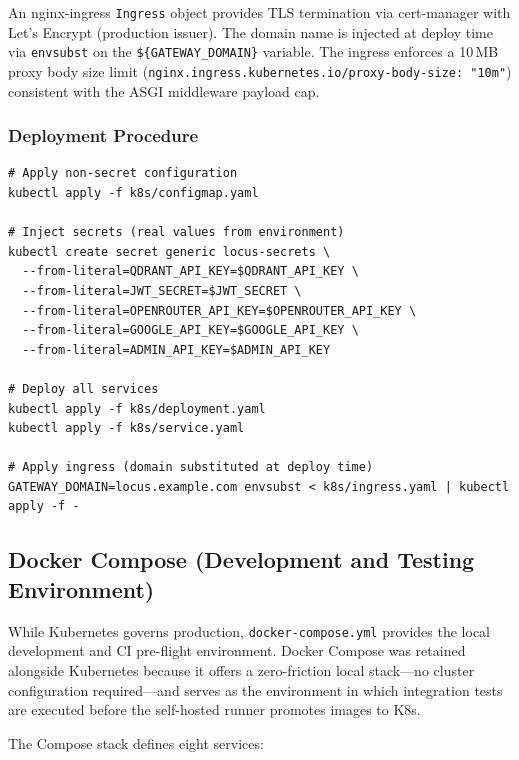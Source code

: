 \documentclass[12pt]{article}
\begin{document}
An nginx-ingress \texttt{Ingress} object provides TLS termination via cert-manager with Let's Encrypt (production issuer). The domain name is injected at deploy time via \texttt{envsubst} on the \texttt{\$\{GATEWAY\_DOMAIN\}} variable. The ingress enforces a 10\,MB proxy body size limit (\texttt{nginx.ingress.kubernetes.io/proxy-body-size: "10m"}) consistent with the ASGI middleware payload cap.

\subsubsection{Deployment Procedure}

\begin{lstlisting}[caption={Kubernetes deployment commands on Azure Standard\_B2ms}]
# Apply non-secret configuration
kubectl apply -f k8s/configmap.yaml

# Inject secrets (real values from environment)
kubectl create secret generic locus-secrets \
  --from-literal=QDRANT_API_KEY=$QDRANT_API_KEY \
  --from-literal=JWT_SECRET=$JWT_SECRET \
  --from-literal=OPENROUTER_API_KEY=$OPENROUTER_API_KEY \
  --from-literal=GOOGLE_API_KEY=$GOOGLE_API_KEY \
  --from-literal=ADMIN_API_KEY=$ADMIN_API_KEY

# Deploy all services
kubectl apply -f k8s/deployment.yaml
kubectl apply -f k8s/service.yaml

# Apply ingress (domain substituted at deploy time)
GATEWAY_DOMAIN=locus.example.com envsubst < k8s/ingress.yaml | kubectl apply -f -
\end{lstlisting}

\subsection{Docker Compose (Development and Testing Environment)}
\label{sec:compose}

While Kubernetes governs production, \texttt{docker-compose.yml} provides the local development and CI pre-flight environment. Docker Compose was retained alongside Kubernetes because it offers a zero-friction local stack---no cluster configuration required---and serves as the environment in which integration tests are executed before the self-hosted runner promotes images to K8s.

The Compose stack defines eight services:
\end{document}
